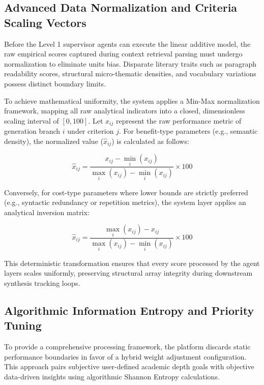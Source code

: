 \subsection{Advanced Data Normalization and Criteria Scaling Vectors}
Before the Level 1 supervisor agents can execute the linear additive model, the raw empirical scores captured during context retrieval parsing must undergo normalization to eliminate units bias. Disparate literary traits such as paragraph readability scores, structural micro-thematic densities, and vocabulary variations possess distinct boundary limits. 

To achieve mathematical uniformity, the system applies a Min-Max normalization framework, mapping all raw analytical indicators into a closed, dimensionless scaling interval of \([0, 100]\). Let \(x_{ij}\) represent the raw performance metric of generation branch \(i\) under criterion \(j\). For benefit-type parameters (e.g., semantic density), the normalized value (\(\hat{x}_{ij}\)) is calculated as follows:

\begin{equation}
\hat{x}_{ij} = \frac{x_{ij} - \min_{i}(x_{ij})}{\max_{i}(x_{ij}) - \min_{i}(x_{ij})} \times 100
\end{equation}

Conversely, for cost-type parameters where lower bounds are strictly preferred (e.g., syntactic redundancy or repetition metrics), the system layer applies an analytical inversion matrix:

\begin{equation}
\hat{x}_{ij} = \frac{\max_{i}(x_{ij}) - x_{ij}}{\max_{i}(x_{ij}) - \min_{i}(x_{ij})} \times 100
\end{equation}

This deterministic transformation ensures that every score processed by the agent layers scales uniformly, preserving structural array integrity during downstream synthesis tracking loops.

\subsection{Algorithmic Information Entropy and Priority Tuning}
To provide a comprehensive processing framework, the platform discards static performance boundaries in favor of a hybrid weight adjustment configuration. This approach pairs subjective user-defined academic depth goals with objective data-driven insights using algorithmic Shannon Entropy calculations. 

